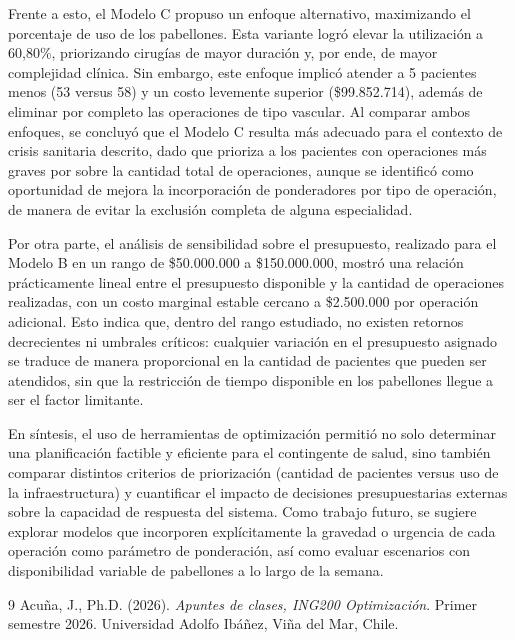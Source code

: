 \documentclass[a4paper,12pt]{book}
\begin{document}
	Frente a esto, el Modelo C propuso un enfoque alternativo, maximizando el porcentaje de uso de los pabellones. Esta variante logró elevar la utilización a 60,80\%, priorizando cirugías de mayor duración y, por ende, de mayor complejidad clínica. Sin embargo, este enfoque implicó atender a 5 pacientes menos (53 versus 58) y un costo levemente superior (\$99.852.714), además de eliminar por completo las operaciones de tipo vascular. Al comparar ambos enfoques, se concluyó que el Modelo C resulta más adecuado para el contexto de crisis sanitaria descrito, dado que prioriza a los pacientes con operaciones más graves por sobre la cantidad total de operaciones, aunque se identificó como oportunidad de mejora la incorporación de ponderadores por tipo de operación, de manera de evitar la exclusión completa de alguna especialidad.
	
	Por otra parte, el análisis de sensibilidad sobre el presupuesto, realizado para el Modelo B en un rango de \$50.000.000 a \$150.000.000, mostró una relación prácticamente lineal entre el presupuesto disponible y la cantidad de operaciones realizadas, con un costo marginal estable cercano a \$2.500.000 por operación adicional. Esto indica que, dentro del rango estudiado, no existen retornos decrecientes ni umbrales críticos: cualquier variación en el presupuesto asignado se traduce de manera proporcional en la cantidad de pacientes que pueden ser atendidos, sin que la restricción de tiempo disponible en los pabellones llegue a ser el factor limitante.
	
	En síntesis, el uso de herramientas de optimización permitió no solo determinar una planificación factible y eficiente para el contingente de salud, sino también comparar distintos criterios de priorización (cantidad de pacientes versus uso de la infraestructura) y cuantificar el impacto de decisiones presupuestarias externas sobre la capacidad de respuesta del sistema. Como trabajo futuro, se sugiere explorar modelos que incorporen explícitamente la gravedad o urgencia de cada operación como parámetro de ponderación, así como evaluar escenarios con disponibilidad variable de pabellones a lo largo de la semana.


\begin{thebibliography}{9}
	 Acuña, J., Ph.D. (2026).
	\emph{Apuntes de clases, ING200 Optimización}.
	Primer semestre 2026. Universidad Adolfo Ibáñez, Viña del Mar, Chile.
\end{thebibliography}
\end{document}
